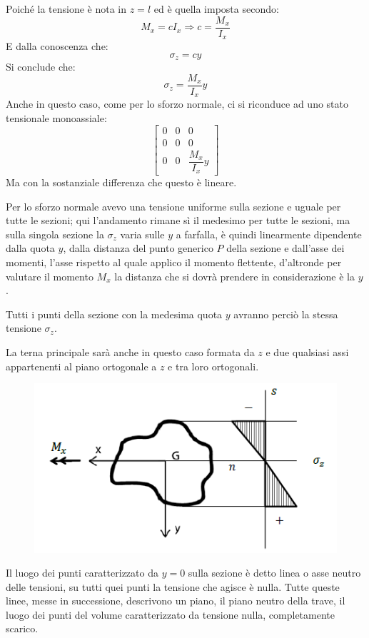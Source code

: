 		Poiché la tensione è nota in $z = l$ ed è quella imposta secondo:
		\[M_x = cI_x \Rightarrow c = \dfrac{M_x}{I_x} \]
		E dalla conoscenza che:
		\[ \sigma_z = cy\]
		Si conclude che: 
		\[ \sigma_z = \dfrac{M_x}{I_x}y \]
		Anche in questo caso, come per lo sforzo normale, ci si riconduce ad uno stato tensionale monoassiale: 
		\begin{equation}
			\boxed{\left[\begin{array}{ccc}
			0 & 0 & 0 \\
			0 & 0 & 0 \\
			0 & 0 & \dfrac{M_x}{I_x}y
		\end{array}\right]}
		\end{equation}
		Ma con la sostanziale differenza che questo è lineare.
		
		Per lo sforzo normale avevo una tensione uniforme sulla sezione e uguale per tutte le sezioni; qui l'andamento rimane sì il medesimo per tutte le sezioni, ma sulla singola sezione la $\sigma_z$ varia sulle $y$ a farfalla, è quindi linearmente dipendente dalla quota $y$, dalla distanza del punto generico $P$ della sezione e dall'asse dei momenti, l'asse rispetto al quale applico il momento flettente, d'altronde per valutare il momento $M_x$ la distanza che si dovrà prendere in considerazione è la $y$. 
		
		Tutti i punti della sezione con la medesima quota $ y $ avranno perciò la stessa tensione $\sigma_z$. 
		
		La terna principale sarà anche in questo caso formata da $ z $ e due qualsiasi assi
		appartenenti al piano ortogonale a $ z $ e tra loro ortogonali.
		
\begin{figure}[H]
	\centering
	\includegraphics[width=0.5\linewidth]{Immagini_3/screenshot002}
	\label{fig:screenshot002}
\end{figure}

		Il luogo dei punti caratterizzato da $y=0$ sulla sezione è detto linea o asse neutro delle tensioni, su tutti quei punti la tensione che agisce è nulla. Tutte queste linee, messe in successione, descrivono un piano, il piano neutro della trave, il luogo dei punti del volume caratterizzato da tensione nulla, completamente scarico. 
		
